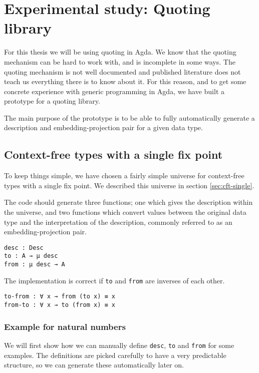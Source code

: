 \section{Experimental study: Quoting library}\label{sec:prototype}

For this thesis we will be using quoting in Agda.
We know that the quoting mechanism can be hard to work with, and is
incomplete in some ways.
The quoting mechanism is not well documented and published literature
does not teach us everything there is to know about it.
For this reason, and to get some concrete experience with generic
programming in Agda, we have built a prototype for a quoting library.

The main purpose of the prototype is to be able to fully automatically
generate a description and embedding-projection pair for a given data
type.

\subsection{Context-free types with a single fix point}

To keep things simple, we have chosen a fairly simple universe for
context-free types with a single fix
point.
We described this universe in section \ref{sec:cft-single}.

The code should generate three functions; one which gives the
description within the universe, and two functions which convert
values between the original data type and the interpretation of the
description, commonly referred to as an embedding-projection pair.

\begin{verbatim}
desc : Desc
to : A → μ desc
from : μ desc → A
\end{verbatim}

The implementation is correct if \texttt{to} and \texttt{from} are
inverses of each other.

\begin{verbatim}
to-from : ∀ x → from (to x) ≡ x
from-to : ∀ x → to (from x) ≡ x
\end{verbatim}

\subsubsection[Example for natural numbers]
  {Example for natural numbers}

We will first show how we can manually define \texttt{desc},
\texttt{to} and \texttt{from} for some examples.
The definitions are picked carefully to have a very predictable
structure, so we can generate these automatically later on.

